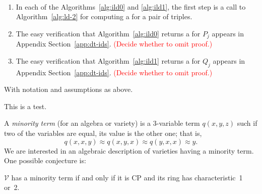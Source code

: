   \begin{remarks}\
  \begin{enumerate}[1.]
  \item In each of the Algorithms~\ref{alg:ild0} and \ref{alg:ild1},
  the first step is a call to Algorithm~\ref{alg:ld-2}
  for computing a \ldto for a pair of triples.
  \item The easy verification that Algorithm~\ref{alg:ild0} returns
  a \ldto for $P_j$ appears in Appendix Section~\ref{app:dt-ids}.
  \textcolor{red}{(Decide whether to omit proof.)}
  \item The easy verification that Algorithm~\ref{alg:ild1} returns
  a \ldto for $Q_j$ appears in Appendix Section~\ref{app:dt-ids}.
  \textcolor{red}{(Decide whether to omit proof.)}
  \end{enumerate}
  \end{remarks}


























  With notation and assumptions as above.

  \begin{theorem}
  This is a test.
  \end{theorem}






  
  



  A \emph{minority term} (for an algebra or variety) is a
  3-variable term $q(x,y,z)$ such if two of the variables
  are equal, its value is the other one; that is,
  \[
  q(x,x,y) \approx q(x,y,x) \approx q(y,x,x) \approx y.
  \]
  We are interested in an algebraic description of varieties having
  a minority term. One possible conjecture is:
  \begin{conjecture}
  $\mathcal V$ has a minority term if and only if it is CP and its
  ring has characteristic~1 or~2.
  \end{conjecture}



